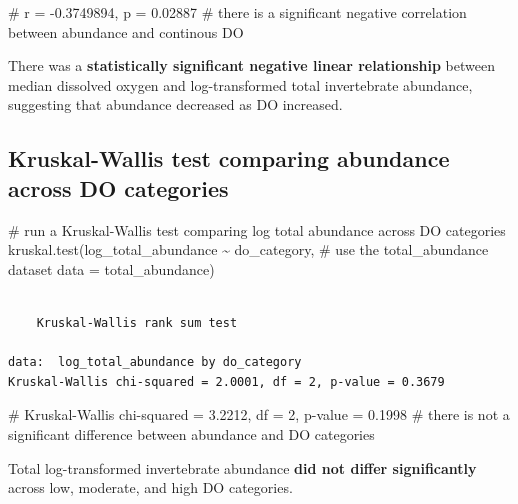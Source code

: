 \documentclass[
  letterpaper,
  DIV=11,
  numbers=noendperiod]{scrartcl}
\newenvironment{Shaded}{\begin{snugshade}}{\end{snugshade}}
\newcommand{\AttributeTok}[1]{\textcolor[rgb]{0.40,0.45,0.13}{#1}}
\newcommand{\CommentTok}[1]{\textcolor[rgb]{0.37,0.37,0.37}{#1}}
\newcommand{\FunctionTok}[1]{\textcolor[rgb]{0.28,0.35,0.67}{#1}}
\newcommand{\NormalTok}[1]{\textcolor[rgb]{0.00,0.23,0.31}{#1}}
\newcommand{\SpecialCharTok}[1]{\textcolor[rgb]{0.37,0.37,0.37}{#1}}
\begin{document}
\begin{Shaded}
\begin{Highlighting}[]
\CommentTok{\# r = {-}0.3749894, p = 0.02887}
\CommentTok{\# there is a significant negative correlation between abundance and continous DO}
\end{Highlighting}
\end{Shaded}

There was a \textbf{statistically significant negative linear
relationship} between median dissolved oxygen and log-transformed total
invertebrate abundance, suggesting that abundance decreased as DO
increased.

\subsection{Kruskal-Wallis test comparing abundance across DO
categories}\label{kruskal-wallis-test-comparing-abundance-across-do-categories}

\begin{Shaded}
\begin{Highlighting}[]
\CommentTok{\# run a Kruskal{-}Wallis test comparing log total abundance across DO categories}
\FunctionTok{kruskal.test}\NormalTok{(log\_total\_abundance }\SpecialCharTok{\textasciitilde{}}\NormalTok{ do\_category,}
             \CommentTok{\# use the total\_abundance dataset}
             \AttributeTok{data =}\NormalTok{ total\_abundance)}
\end{Highlighting}
\end{Shaded}

\begin{verbatim}

    Kruskal-Wallis rank sum test

data:  log_total_abundance by do_category
Kruskal-Wallis chi-squared = 2.0001, df = 2, p-value = 0.3679
\end{verbatim}

\begin{Shaded}
\begin{Highlighting}[]
\CommentTok{\# Kruskal{-}Wallis chi{-}squared = 3.2212, df = 2, p{-}value = 0.1998}
\CommentTok{\# there is not a significant difference between abundance and DO categories}
\end{Highlighting}
\end{Shaded}

Total log-transformed invertebrate abundance \textbf{did not differ
significantly} across low, moderate, and high DO categories.
\end{document}
